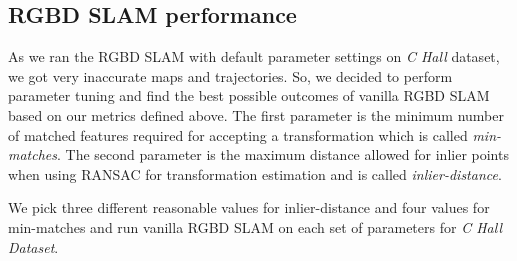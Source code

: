 \subsection{RGBD SLAM performance}
As we ran the RGBD SLAM with default parameter settings on {\it C Hall} dataset, we got very inaccurate maps and trajectories. 
So, we decided to perform parameter tuning and find the best possible outcomes of vanilla RGBD SLAM based on our metrics defined above. 
The first parameter is the minimum number of matched features required for accepting a transformation which is called {\it min-matches}.
The second parameter is the maximum distance allowed for inlier points when using RANSAC for transformation estimation and is called {\it inlier-distance}.

We pick three different reasonable values for inlier-distance and four values for min-matches and run vanilla RGBD SLAM on each set of parameters for {\it C Hall Dataset}. 

